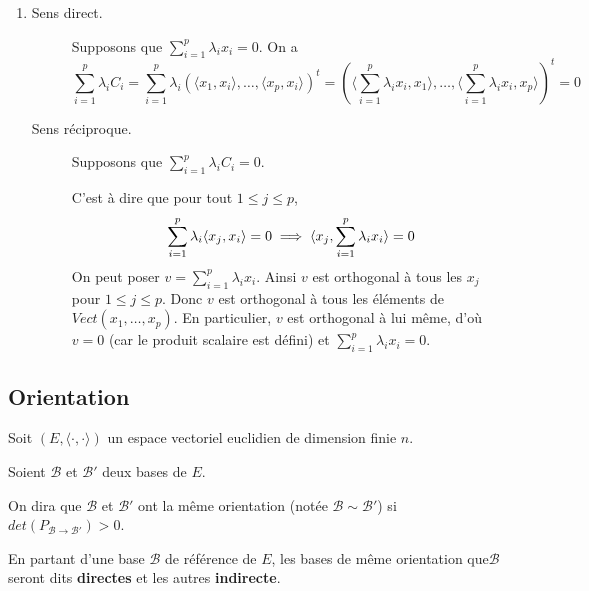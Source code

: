 \documentclass[a4paper, 12pt]{article}
\begin{document}
\begin{demonstration}
    \begin{enumerate}
        \item
        \begin{description}
            \item[Sens direct.] Supposons que $\sum_{i=1}^p \lambda_i x_i = 0$. 
            On a
            $$
            \sum_{i=1}^p \lambda_i C_i = \sum_{i=1}^p \lambda_i (\langle x_1, x_i \rangle, \dots, \langle x_p, x_i \rangle)^t = (\langle \sum_{i=1}^p \lambda_i x_i, x_1 \rangle, \dots, \langle \sum_{i=1}^p \lambda_i x_i, x_p \rangle)^t = 0
            $$ 
            \item[Sens réciproque.] Supposons que $\sum_{i=1}^p \lambda_i C_i = 0$.
            
            C'est à dire que pour tout $1 \leq j \leq p$,
            $$
            \sum_{i=1}^p \lambda_i \langle x_j, x_i \rangle = 0 \implies \langle x_j, \sum_{i=1}^p \lambda_i x_i \rangle = 0 \\
            $$
            On peut poser $v = \sum\limits_{i=1}^p \lambda_i x_i$. Ainsi $v$ est orthogonal à tous les $x_j$ pour $1 \leq j \leq p$. Donc $v$ est orthogonal à tous les éléments de $Vect(x_1, \dots, x_p)$.
            En particulier, $v$ est orthogonal à lui même, d'où $v = 0$ (car le produit scalaire est défini) et $\sum_{i=1}^p \lambda_i x_i = 0$.
        \end{description}
    \end{enumerate}
\end{demonstration}

\subsection{Orientation}

\begin{definition}
    Soit $(E, \langle \cdot, \cdot \rangle)$ un espace vectoriel euclidien de dimension finie $n$.

    Soient $\mathcal{B}$ et $\mathcal{B}'$ deux bases de $E$.
    
    On dira que $\mathcal{B}$ et $\mathcal{B}'$ ont la même orientation (notée $\mathcal{B} \sim \mathcal{B}'$) si $det(P_{\mathcal{B} \to \mathcal{B}'}) > 0$.

    En partant d'une base $\mathcal{B}$ de référence de $E$, les bases de même orientation que$\mathcal{B}$ seront dits \textbf{directes} et les autres \textbf{indirecte}.
\end{definition}
\end{document}
